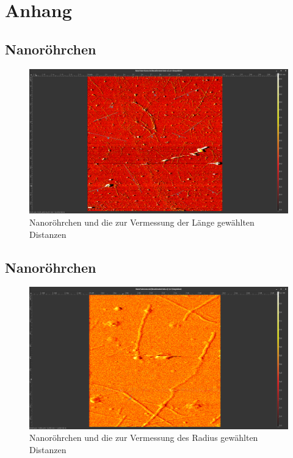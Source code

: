 

\chapter{Anhang}
\label{chap:anhangA}
\section{Nanoröhrchen}
\begin{figure}
    \centering
    \includegraphics[width = \linewidth]{Bilder/Nanotubes/NanoTube15umLaenge2.png}
    \caption{Nanoröhrchen und die zur Vermessung der Länge gewählten Distanzen}
    \label{Nanotube20Mess}
\end{figure}

\section{Nanoröhrchen}
\begin{figure}
    \centering
    \includegraphics[width = \linewidth]{Bilder/Nanotubes/NanotubesBreiteHoehe2.png}
    \caption{Nanoröhrchen und die zur Vermessung des Radius gewählten Distanzen}
    \label{NanoRadius}
\end{figure}
